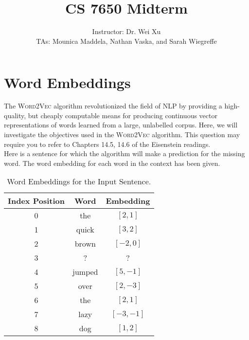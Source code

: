 \documentclass[12pt, letterpaper]{article}
\begin{document}
\title{CS 7650 Midterm}
\author{Instructor: Dr. Wei Xu \\ TAs: Mounica Maddela, Nathan Vaska, and Sarah Wiegreffe}
\date{}
\maketitle

\section{Word Embeddings}

The \textsc{Word2Vec} algorithm revolutionized the field of NLP by providing a high-quality, but cheaply computable means for producing continuous vector representations of words learned from a large, unlabelled corpus. Here, we will investigate the objectives used in the \textsc{Word2Vec} algorithm. This question may require you to refer to Chapters 14.5, 14.6 of the Eisenstein readings. \\

Here is a sentence for which the algorithm will make a prediction for the missing word. The word embedding for each word in the context has been given.

\begin{table}[h!]
    \centering
    \begin{tabular}{|ccc|}
    \toprule
    \textbf{Index Position} & \textbf{Word} & \textbf{Embedding} \\
    \midrule
    0 & the & $[2,1]$ \\
    1 & quick & $[3,2]$ \\
    2 & brown & $[-2,0]$ \\
    3 & ? & ?\\
    4 & jumped & $[5,-1]$\\
    5 & over & $[2,-3]$\\
    6 & the & $[2,1]$\\
    7 & lazy & $[-3,-1]$\\
    8 & dog & $[1,2]$\\
    
    \bottomrule
    \end{tabular}
    \caption{Word Embeddings for the Input Sentence.}
\end{table}
\end{document}
